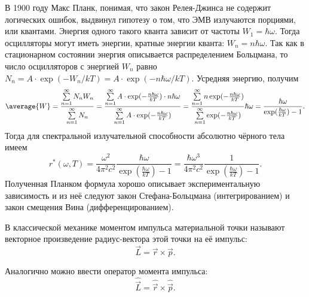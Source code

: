 \documentclass{hedexams}
\begin{document}
В 1900 году Макс Планк, понимая, что закон Релея-Джинса не содержит логических
ошибок, выдвинул гипотезу о том, что ЭМВ излучаются порциями, или квантами.
Энергия одного такого кванта зависит от частоты \( W_1 = \hbar\omega \).
Тогда осцилляторы могут иметь энергии, кратные энергии кванта:
\( W_n = n\hbar\omega \). Так как в стационарном состоянии энергия описывается
распределением Больцмана, то число осцилляторов с энергией \( W_n \) равно
\( N_n = A\cdot\exp(-W_n/kT) = A\cdot\exp(-n\hbar\omega/kT) \). Усредняя
энергию, получим
\[
    \average{W} =
    \frac{\sum\limits_{n=1}^\infty N_nW_n}{\sum\limits_{n=1}^\infty N_n} =
    \frac{\sum\limits_{n=1}^\infty A\cdot\exp(-\frac{n\hbar\omega}{kT})\cdot
    n\hbar\omega}{\sum\limits_{n=1}^\infty A\cdot\exp(-\frac{n\hbar\omega}{kT})} =
    \frac{\sum\limits_{n=1}^\infty n\exp(-\frac{n\hbar\omega}{kT})}
    {\sum\limits_{n=1}^\infty \exp(-\frac{n\hbar\omega}{kT})}\hbar\omega =
    \frac{\hbar\omega}{\exp(\frac{\hbar\omega}{kT}) - 1}.
\]
Тогда для спектральной излучательной способности абсолютно чёрного тела имеем
\[
    r^*(\omega, T) = \frac{\omega^2}{4\pi^2c^2}
    \frac{\hbar\omega}{\exp(\frac{\hbar\omega}{kT}) - 1} = \frac{\hbar\omega^3}
    {4\pi^2c^2}\frac{1}{\exp(\frac{\hbar\omega}{kT}) - 1}.
\]
Полученная Планком формула хорошо описывает экспериментальную зависимость и из
неё следуют закон Стефана-Больцмана (интегрированием) и закон смещения Вина
(дифференцированием).


В классической механике моментом импульса материальной точки называют векторное
произведение радиус-вектора этой точки на её импульс:
\[
    \vec{L} = \vec{r}\times\vec{p}.
\]

Аналогично можно ввести оператор момента импульса:
\[
    \hat{\vec{L}} = \hat{\vec{r}}\times\hat{\vec{p}}.
\]
\end{document}
